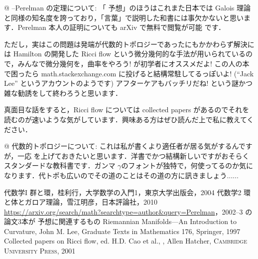 \documentclass[11pt]{jsarticle}
\begin{document}
\begin{easylist}[itemize]
  @ {\Poincare}--Perelman の定理について: 「{\Poincare} 予想」のほうはこれまた日本では Galois 理論と同様の知名度を誇っており，「言葉」で説明した和書には事欠かないと思います．Perelman 本人の証明についても arXiv で無料で閲覧が可能 \cite{perelman} です．

  ただし，実はこの問題は発端が代数的トポロジーであったにもかかわらず解決には Hamilton の開発した Ricci flow という微分幾何的な手法が用いられているので，みんなで微分幾何を，曲率をやろう! \cite{lee} が初学者にオススメだよ! この人の本で困ったら math.stackexchange.com に投げると結構常駐してるっぽいよ! (``Jack Lee'' というアカウントのようです) アフターケアもバッチリだね! という謎かつ雑な勧誘をして終わろうと思います．

  真面目な話をすると，Ricci flow については collected papers \cite{collected} があるのでそれを読むのが速いような気がしています．興味ある方はぜひ読んだ上で私に教えてください．
  
  @ 代数的トポロジーについて: これは私が書くより適任者が居る気がするんですが，一応 \cite{hatcher} を上げておきたいと思います．洋書でかつ結構新しいですがおそらくスタンダードな教科書です．ガンマ $\gamma$のフォントが独特で，何使ってるのか気になります．代トポも広いのでその道のことはその道の方に訊きましょう......
\end{easylist}
\begin{thebibliography}{100}
 代数学I 群と環，桂利行，大学数学の入門1，東京大学出版会，2004
 代数学2 環と体とガロア理論，雪江明彦，日本評論社，2010
 \url{https://arxiv.org/search/math?searchtype=author&query=Perelman}，2002--3 の論文3本が {\Poincare} 予想に関連するもの
 Riemannian Manifolds---An Introduction to Curvature, John M. Lee, Graduate Texts in Mathematics 176, Springer, 1997
 Collected papers on Ricci flow, ed. H.D. Cao et al.,
, Allen Hatcher, {\scshape Cambridge University Press}, 2001
\end{thebibliography}
\end{document}

